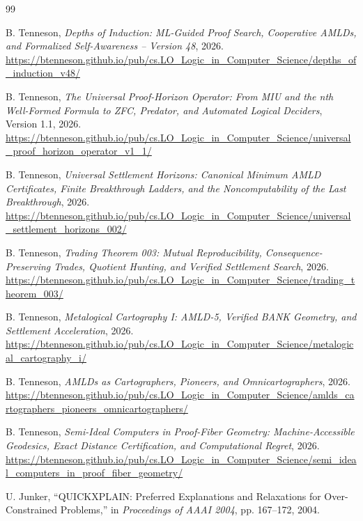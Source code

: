 \documentclass[11pt]{article}
\theoremstyle{remark}
\begin{document}
\begin{thebibliography}{99}

B. Tenneson, \emph{Depths of Induction: ML-Guided Proof Search, Cooperative AMLDs, and Formalized Self-Awareness -- Version 48}, 2026.\\
\url{https://btenneson.github.io/pub/cs.LO_Logic_in_Computer_Science/depths_of_induction_v48/}

B. Tenneson, \emph{The Universal Proof-Horizon Operator: From MIU and the nth Well-Formed Formula to ZFC, Predator, and Automated Logical Deciders}, Version 1.1, 2026.\\
\url{https://btenneson.github.io/pub/cs.LO_Logic_in_Computer_Science/universal_proof_horizon_operator_v1_1/}

B. Tenneson, \emph{Universal Settlement Horizons: Canonical Minimum AMLD Certificates, Finite Breakthrough Ladders, and the Noncomputability of the Last Breakthrough}, 2026.\\
\url{https://btenneson.github.io/pub/cs.LO_Logic_in_Computer_Science/universal_settlement_horizons_002/}

B. Tenneson, \emph{Trading Theorem 003: Mutual Reproducibility, Consequence-Preserving Trades, Quotient Hunting, and Verified Settlement Search}, 2026.\\
\url{https://btenneson.github.io/pub/cs.LO_Logic_in_Computer_Science/trading_theorem_003/}

B. Tenneson, \emph{Metalogical Cartography I: AMLD-5, Verified BANK Geometry, and Settlement Acceleration}, 2026.\\
\url{https://btenneson.github.io/pub/cs.LO_Logic_in_Computer_Science/metalogical_cartography_i/}

B. Tenneson, \emph{AMLDs as Cartographers, Pioneers, and Omnicartographers}, 2026.\\
\url{https://btenneson.github.io/pub/cs.LO_Logic_in_Computer_Science/amlds_cartographers_pioneers_omnicartographers/}

B. Tenneson, \emph{Semi-Ideal Computers in Proof-Fiber Geometry: Machine-Accessible Geodesics, Exact Distance Certification, and Computational Regret}, 2026.\\
\url{https://btenneson.github.io/pub/cs.LO_Logic_in_Computer_Science/semi_ideal_computers_in_proof_fiber_geometry/}

U. Junker, ``QUICKXPLAIN: Preferred Explanations and Relaxations for Over-Constrained Problems,'' in \emph{Proceedings of AAAI 2004}, pp. 167--172, 2004.


\end{thebibliography}
\end{document}
